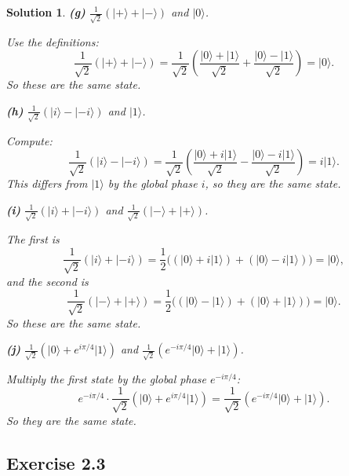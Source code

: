 \documentclass[11pt,a4paper]{article}
\theoremstyle{sol}
\newtheorem*{solution}{Solution}
\newcommand{\ket}[1]{\lvert #1\rangle}
\begin{document}
\begin{solution}
\textbf{(g)} $\frac{1}{\sqrt2}(\ket{+}+\ket{-})$ and $\ket{0}$.

Use the definitions:
\[
\frac{1}{\sqrt2}(\ket{+}+\ket{-})
=\frac{1}{\sqrt2}\left(
\frac{\ket{0}+\ket{1}}{\sqrt2}
+\frac{\ket{0}-\ket{1}}{\sqrt2}
\right)
=\ket{0}.
\]
So these are the same state.

\textbf{(h)} $\frac{1}{\sqrt2}(\ket{i}-\ket{-i})$ and $\ket{1}$.

Compute:
\[
\frac{1}{\sqrt2}(\ket{i}-\ket{-i})
=\frac{1}{\sqrt2}\left(
\frac{\ket{0}+i\ket{1}}{\sqrt2}
-\frac{\ket{0}-i\ket{1}}{\sqrt2}
\right)
=i\ket{1}.
\]
This differs from $\ket{1}$ by the global phase $i$, so they are the same state.

\textbf{(i)} $\frac{1}{\sqrt2}(\ket{i}+\ket{-i})$ and $\frac{1}{\sqrt2}(\ket{-}+\ket{+})$.

The first is
\[
\frac{1}{\sqrt2}(\ket{i}+\ket{-i})
=\frac{1}{2}\bigl((\ket{0}+i\ket{1})+(\ket{0}-i\ket{1})\bigr)
=\ket{0},
\]
and the second is
\[
\frac{1}{\sqrt2}(\ket{-}+\ket{+})
=\frac{1}{2}\bigl((\ket{0}-\ket{1})+(\ket{0}+\ket{1})\bigr)
=\ket{0}.
\]
So these are the same state.

\textbf{(j)} $\frac{1}{\sqrt2}(\ket{0}+e^{i\pi/4}\ket{1})$ and $\frac{1}{\sqrt2}(e^{-i\pi/4}\ket{0}+\ket{1})$.

Multiply the first state by the global phase $e^{-i\pi/4}$:
\[
e^{-i\pi/4}\cdot\frac{1}{\sqrt2}(\ket{0}+e^{i\pi/4}\ket{1})
=\frac{1}{\sqrt2}(e^{-i\pi/4}\ket{0}+\ket{1}).
\]
So they are the same state.
\end{solution}

\clearpage
\subsection*{Exercise 2.3}
\end{document}
